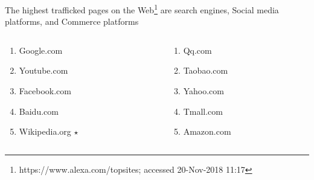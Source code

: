 \documentclass[aspectratio=169]{beamer}
\newcounter{savedenum}
\newcommand*{\saveenum}{\setcounter{savedenum}{\theenumi}}
\newcommand*{\resume}{\setcounter{enumi}{\thesavedenum}}
\begin{document}
{
%
\begin{frame}
\frametitle{}
The highest trafficked pages on the Web\footnote{https://www.alexa.com/topsites; accessed 20-Nov-2018 11:17} are search engines, Social media platforms, and Commerce platforms
\begin{columns}[T]
  \begin{column}{.5\linewidth}
  \begin{enumerate}
	\item{Google.com}
	\item{Youtube.com}
	\item{Facebook.com}
	\item{Baidu.com}
	\item{Wikipedia.org $\star$}
    \saveenum
  \end{enumerate}
  \end{column}
  \begin{column}{.5\linewidth}
  \begin{enumerate}
    \resume
         \item{Qq.com}
	\item{Taobao.com}
	\item{Yahoo.com}
	\item{Tmall.com}
	\item{Amazon.com}  
	\end{enumerate}
  \end{column}
\end{columns}

\end{frame}
}
\end{document}
